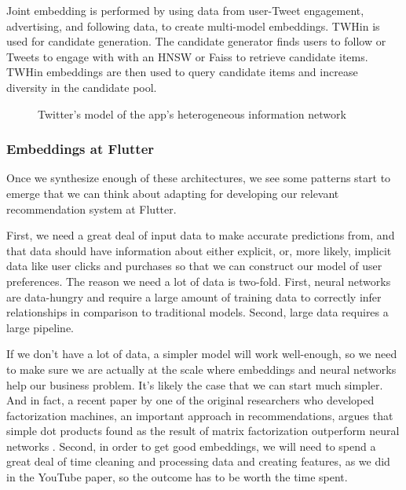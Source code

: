 \documentclass[11pt, table]{diazessay} %
\begin{document}
\begin{sloppypar}
Joint embedding is performed by using data from user-Tweet engagement, advertising, and following data, to create multi-model embeddings. TWHin is used for candidate generation. The candidate generator finds users to follow or Tweets to engage with with an HNSW or Faiss to retrieve candidate items. TWHin embeddings are then used to query candidate items and increase diversity in the candidate pool.

\begin{figure}[H]
\caption{Twitter's model of the app's heterogeneous information network \citep{el2022twhin}}
\end{figure}


\subsubsection*{Embeddings at Flutter}

Once we synthesize enough of these architectures, we see some patterns start to emerge that we can think about adapting for developing our relevant recommendation system at Flutter.

First, we need a great deal of input data to make accurate predictions from, and that data should have information about either explicit, or, more likely, implicit data like user clicks and purchases so that we can construct our model of user preferences. The reason we need a lot of data is two-fold. First, neural networks are data-hungry and require a large amount of training data to correctly infer relationships in comparison to traditional models. Second, large data requires a large pipeline.  

If we don't have a lot of data, a simpler model will work well-enough, so we need to make sure we are actually at the scale where embeddings and neural networks help our business problem. It's likely the case that we can start much simpler. And in fact, a recent paper by one of the original researchers who developed factorization machines, an important approach in recommendations, argues that simple dot products found as the result of matrix factorization outperform neural networks \citep{rendle2020neural}.  Second, in order to get good embeddings, we will need to spend a great deal of time cleaning and processing data and creating features, as we did in the YouTube paper, so the outcome has to be worth the time spent.


\end{sloppypar}
\end{document}
